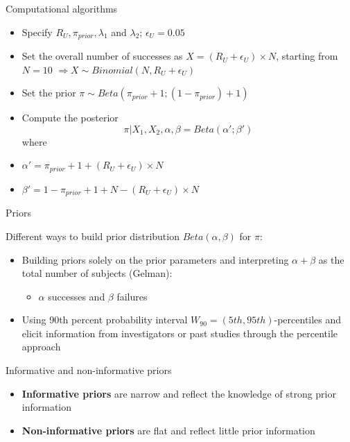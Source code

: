 \documentclass{beamer}
\begin{document}
\begin{frame}{Computational algorithms}

\begin{itemize}
\item
  Specify \(R_U, \pi_{prior}, \lambda_1\) and \(\lambda_2\);
  \(\epsilon_U = 0.05\)
\item
  Set the overall number of successes as \(X=(R_U+\epsilon_U)\times N\),
  starting from \(N=10\)
  \(\Longrightarrow X \sim Binomial(N, R_U+\epsilon_U)\)
\item
  Set the prior \(\pi\sim Beta(\pi_{prior}+1; (1-\pi_{prior})+1)\)
\item
  Compute the posterior \[
  \pi\vert X_1,X_2,\alpha, \beta = Beta(\alpha';\beta') 
  \] where
\item
  \(\alpha' = \pi_{prior}+1+(R_U+\epsilon_U)\times N\)
\item
  \(\beta' = 1-\pi_{prior}+1+N-(R_U+\epsilon_U)\times N\)
\end{itemize}

\end{frame}

\begin{frame}{Priors}

Different ways to build prior distribution \(Beta(\alpha,\beta)\) for
\(\pi\):

\begin{itemize}
\itemsep1pt\parskip0pt
\item
  Building priors solely on the prior parameters and interpreting
  \(\alpha + \beta\) as the total number of subjects (Gelman):

  \begin{itemize}
  \itemsep1pt\parskip0pt
  \item
    \(\alpha\) successes and \(\beta\) failures
  \end{itemize}
\item
  Using 90th percent probability interval
  \(W_{90} = (5th, 95th)\)-percentiles and elicit information from
  investigators or past studies through the percentile approach
\end{itemize}

Informative and non-informative priors

\begin{itemize}
\itemsep1pt\parskip0pt
\item
  \textbf{Informative priors} are narrow and reflect the knowledge of
  strong prior information
\item
  \textbf{Non-informative priors} are flat and reflect little prior
  information
\end{itemize}

\end{frame}
\end{document}
